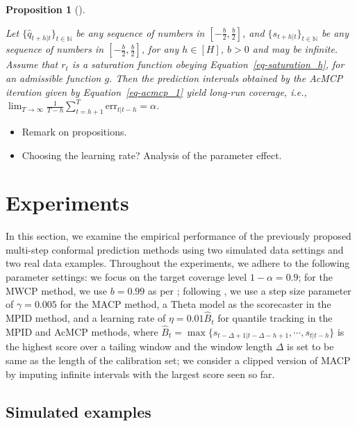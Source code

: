 \documentclass[
  11pt,
  a4paper,
]{article}
\theoremstyle{plain}
\newtheorem{proposition}{Proposition}[section]
\theoremstyle{plain}
\theoremstyle{remark}
\begin{document}
\begin{proposition}[]\protect\hypertarget{prp-cov_acmcp}{}\label{prp-cov_acmcp}

Let \(\{\hat{q}_{t+h|t}\}_{t\in\mathbb{N}}\) be any sequence of numbers
in \([-\frac{b}{2}, \frac{b}{2}]\), and
\(\{s_{t+h|t}\}_{t\in\mathbb{N}}\) be any sequence of numbers in
\([-\frac{b}{2},\frac{b}{2}]\), for any \(h\in[H]\), \(b>0\) and may be
infinite. Assume that \(r_t\) is a saturation function obeying
Equation~\ref{eq-saturation_h}, for an admissible function \(g\). Then
the prediction intervals obtained by the AcMCP iteration given by
Equation~\ref{eq-acmcp_1} yield long-run coverage, i.e.,
\(\lim _{T \rightarrow \infty} \frac{1}{T-h} \sum_{t=h+1}^T \mathrm{err}_{t|t-h} = \alpha\).

\end{proposition}

\begin{itemize}
\item
  Remark on propositions.
\item
  Choosing the learning rate? Analysis of the parameter effect.
\end{itemize}

\section{Experiments}\label{experiments}

In this section, we examine the empirical performance of the previously
proposed multi-step conformal prediction methods using two simulated
data settings and two real data examples. Throughout the experiments, we
adhere to the following parameter settings: we focus on the target
coverage level \(1-\alpha=0.9\); for the MWCP method, we use \(b=0.99\)
as per \textcite{barber2023}; following \textcite{angelopoulos2024}, we
use a step size parameter of \(\gamma=0.005\) for the MACP method, a
Theta model as the scorecaster in the MPID method, and a learning rate
of \(\eta=0.01\hat{B}_t\) for quantile tracking in the MPID and AcMCP
methods, where
\(\hat{B}_t=\max\{s_{t-\Delta+1|t-\Delta-h+1},\cdots,s_{t|t-h}\}\) is
the highest score over a tailing window and the window length \(\Delta\)
is set to be same as the length of the calibration set; we consider a
clipped version of MACP by imputing infinite intervals with the largest
score seen so far.

\subsection{Simulated examples}\label{simulated-examples}
\end{document}
